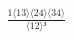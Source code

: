 \documentclass[varwidth, border=5pt]{standalone}
\begin{document}
\begin{my}
$\begin{gathered}
\scriptscriptstyle\frac{1⟨13⟩⟨24⟩⟨34⟩}{⟨12⟩³}
\end{gathered}$
\end{my}
\end{document}
